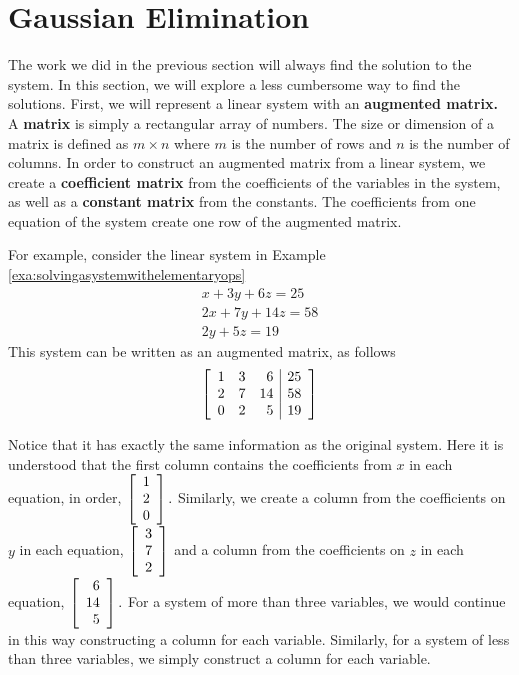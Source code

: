 \section{Gaussian Elimination}

The work we did in the previous section will always find the solution to the system. In this section, we will explore a less cumbersome way to 
find the solutions. First, we will represent a linear system with an \textbf{augmented matrix.} 
A \textbf{matrix}  is simply a rectangular array of numbers. The size or dimension of a matrix  is defined as $m\times n$ where $m$ is the
number of rows and $n$ is the number of columns. In order to construct an augmented matrix
from a linear system, we create a \textbf{coefficient matrix} from the coefficients of the variables in the system, as well as a
\textbf{constant matrix} from the constants. The coefficients from one equation of the system create one row of the augmented matrix. 

For example, consider the linear system in Example \ref{exa:solvingasystemwithelementaryops}
\begin{equation*}
\begin{array}{c}
x+3y+6z=25 \\
2x+7y+14z=58 \\
2y+5z=19
\end{array}
\end{equation*}
This system can be written as an augmented matrix, as follows \:
\begin{equation*}
\left[ 
\begin{array}{rrr|r}
1 & 3 & 6 & 25 \\
2 & 7 & 14 & 58 \\
0 & 2 & 5 & 19
\end{array}
\right] 
\end{equation*}

Notice that it has exactly the same information as the original system. Here it is
understood that the first column contains the coefficients from $x$ in each equation, in order,   
$\left[
\begin{array}{r}
1 \\
2 \\
0
\end{array}
\right] .$ Similarly, we create a column from the coefficients on $y$ in each equation, $\left[
\begin{array}{r}
3 \\
7 \\
2
\end{array}
\right] $ and a column from the coefficients on $z$ in each equation, $\left[
\begin{array}{r}
6 \\
14 \\
5
\end{array}
\right] .$ For a system of more than three variables, we would continue in this way constructing a column for each variable.
Similarly, for a system of less than three variables, we simply construct a column for each variable. 

